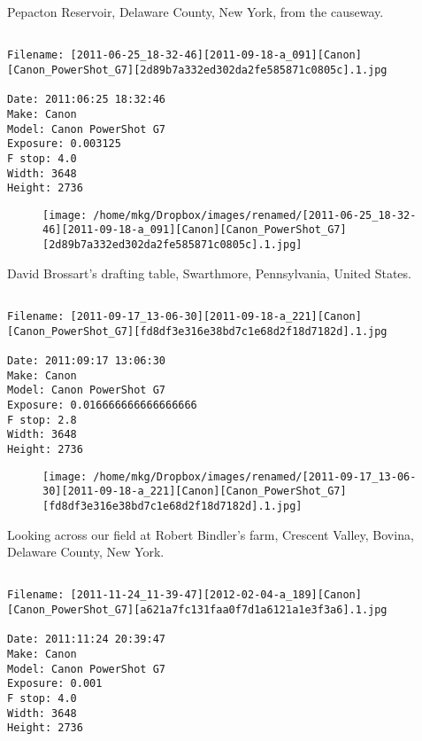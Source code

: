 \clearpage
\onecolumn
\noindent Pepacton Reservoir, Delaware County, New York, from the causeway.
\noindent
\begin{lstlisting}

Filename: [2011-06-25_18-32-46][2011-09-18-a_091][Canon][Canon_PowerShot_G7][2d89b7a332ed302da2fe585871c0805c].1.jpg

Date: 2011:06:25 18:32:46
Make: Canon
Model: Canon PowerShot G7
Exposure: 0.003125
F stop: 4.0
Width: 3648
Height: 2736
\end{lstlisting}
\clearpage

\begin{figure}
\texttt{[image: /home/mkg/Dropbox/images/renamed/[2011-06-25\_18-32-46][2011-09-18-a\_091][Canon][Canon\_PowerShot\_G7][2d89b7a332ed302da2fe585871c0805c].1.jpg]}
\end{figure}
    
\clearpage
\onecolumn
\noindent David Brossart's drafting table, Swarthmore, Pennsylvania, United States.
\noindent
\begin{lstlisting}

Filename: [2011-09-17_13-06-30][2011-09-18-a_221][Canon][Canon_PowerShot_G7][fd8df3e316e38bd7c1e68d2f18d7182d].1.jpg

Date: 2011:09:17 13:06:30
Make: Canon
Model: Canon PowerShot G7
Exposure: 0.016666666666666666
F stop: 2.8
Width: 3648
Height: 2736
\end{lstlisting}
\clearpage

\begin{figure}
\texttt{[image: /home/mkg/Dropbox/images/renamed/[2011-09-17\_13-06-30][2011-09-18-a\_221][Canon][Canon\_PowerShot\_G7][fd8df3e316e38bd7c1e68d2f18d7182d].1.jpg]}
\end{figure}
    
\clearpage
\onecolumn
\noindent Looking across our field at Robert Bindler's farm, Crescent Valley, Bovina, Delaware County, New York.
\noindent
\begin{lstlisting}

Filename: [2011-11-24_11-39-47][2012-02-04-a_189][Canon][Canon_PowerShot_G7][a621a7fc131faa0f7d1a6121a1e3f3a6].1.jpg

Date: 2011:11:24 20:39:47
Make: Canon
Model: Canon PowerShot G7
Exposure: 0.001
F stop: 4.0
Width: 3648
Height: 2736
\end{lstlisting}
\clearpage

